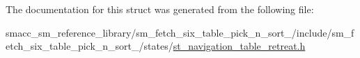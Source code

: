 The documentation for this struct was generated from the following file\+:\begin{DoxyCompactItemize}
\item 
smacc\+\_\+sm\+\_\+reference\+\_\+library/sm\+\_\+fetch\+\_\+six\+\_\+table\+\_\+pick\+\_\+n\+\_\+sort\+\_/include/sm\+\_\+fetch\+\_\+six\+\_\+table\+\_\+pick\+\_\+n\+\_\+sort\+\_/states/\hyperlink{sm__fetch__six__table__pick__n__sort__1_2include_2sm__fetch__six__table__pick__n__sort__1_2state03ddcc1bc3396adeb10de8392f4e0ef3}{st\+\_\+navigation\+\_\+table\+\_\+retreat.\+h}\end{DoxyCompactItemize}

